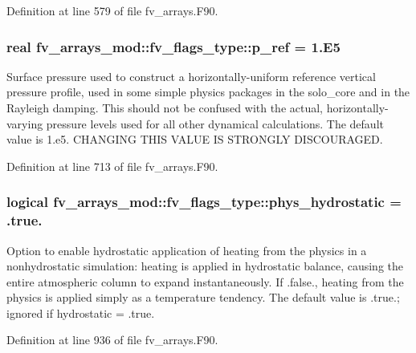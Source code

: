 Definition at line 579 of file fv\-\_\-arrays.\-F90.

\subsubsection[{p\-\_\-ref}]{\setlength{\rightskip}{0pt plus 5cm}real fv\-\_\-arrays\-\_\-mod\-::fv\-\_\-flags\-\_\-type\-::p\-\_\-ref = 1.E5}\label{structfv__arrays__mod_1_1fv__flags__type_acd2a77017fb1e32fc2a931b0458eb135}


Surface pressure used to construct a horizontally-\/uniform reference vertical pressure profile, used in some simple physics packages in the solo\-\_\-core and in the Rayleigh damping. This should not be confused with the actual, horizontally-\/varying pressure levels used for all other dynamical calculations. The default value is 1.\-e5. C\-H\-A\-N\-G\-I\-N\-G T\-H\-I\-S V\-A\-L\-U\-E I\-S S\-T\-R\-O\-N\-G\-L\-Y D\-I\-S\-C\-O\-U\-R\-A\-G\-E\-D. 



Definition at line 713 of file fv\-\_\-arrays.\-F90.

\subsubsection[{phys\-\_\-hydrostatic}]{\setlength{\rightskip}{0pt plus 5cm}logical fv\-\_\-arrays\-\_\-mod\-::fv\-\_\-flags\-\_\-type\-::phys\-\_\-hydrostatic = .true.}\label{structfv__arrays__mod_1_1fv__flags__type_a6f95cb94dff3cd48001b488390cfe582}


Option to enable hydrostatic application of heating from the physics in a nonhydrostatic simulation\-: heating is applied in hydrostatic balance, causing the entire atmospheric column to expand instantaneously. If .false., heating from the physics is applied simply as a temperature tendency. The default value is .true.; ignored if hydrostatic = .true. 



Definition at line 936 of file fv\-\_\-arrays.\-F90.

